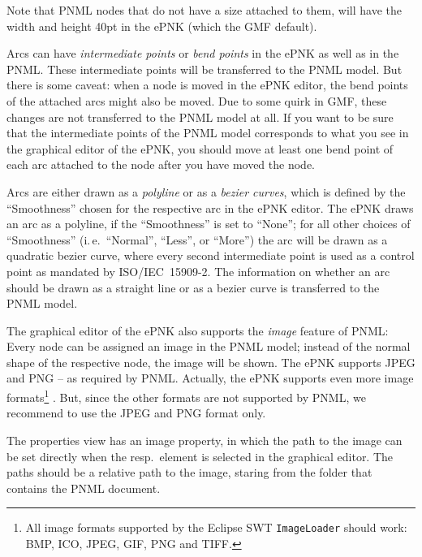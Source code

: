 Note that PNML nodes that do not have a size attached to them, will have the
width and height 40pt in the ePNK (which the GMF default). 

Arcs can have \emph{intermediate points} or \emph{bend points}%
in the ePNK as well as in the PNML. These intermediate points will be
transferred to the PNML model. But there is some caveat: when a node is moved in
the ePNK editor, the bend points of the attached arcs might also be moved. Due
to some quirk in GMF, these changes are not transferred to the PNML model at
all. If you want to be sure that the intermediate points of the PNML model
corresponds to what you see in the graphical editor of the ePNK, you should
move at least one bend point of each arc attached to the node after you have
moved the node.

Arcs are either drawn as a \emph{polyline} or as a \emph{bezier curves}, which
is defined by the ``Smoothness'' chosen for the respective arc in the ePNK
editor. The ePNK draws an arc as a polyline, if the ``Smoothness'' is%
set to ``None''; for all other choices of ``Smoothness'' (i.\,e.\ ``Normal'',
``Less'', or ``More'') the arc will be drawn as a quadratic bezier curve,
where every second intermediate point is used as a control point as mandated
by ISO/IEC~15909-2. The information on whether an arc should be drawn as a
straight line or as a bezier curve is transferred to the PNML model.
 
The graphical editor of the ePNK also supports the \emph{image} feature of PNML:
Every node can be assigned an image in the PNML model; instead of the 
normal shape of the respective node, the image will be shown. The ePNK
supports JPEG and PNG -- as required by PNML. Actually, the ePNK supports
even more image formats\footnote
  {All image formats supported by the Eclipse SWT {\tt ImageLoader}
   should work: BMP, ICO, JPEG, GIF, PNG and TIFF.}%
. But, since the other formats are not supported by PNML, we recommend
to use the JPEG and PNG format only.

The properties view has an image property, in which the path to the image
can be set directly when the resp.\ element is selected in the graphical editor.
The paths should be a relative path to the image, staring from the folder that
contains the PNML document.

